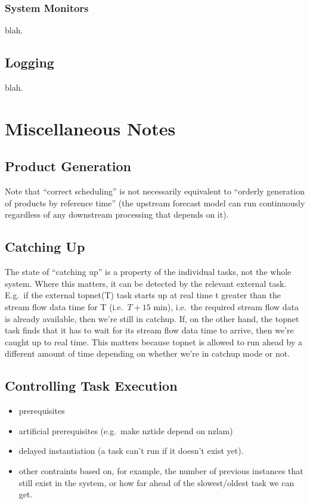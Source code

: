\documentclass[11pt,a4paper]{article}
\begin{document}
\subsubsection{System Monitors}
blah.

\subsection{Logging}
blah.

\section{Miscellaneous Notes}

\subsection{Product Generation}

Note that ``correct scheduling'' is not necessarily equivalent to
``orderly generation of products by reference time'' (the upstream 
forecast model can run continuously regardless of any downstream
processing that depends on it).

\subsection{Catching Up}

The state of ``catching up'' is a property of the individual tasks, not
the whole system. Where this matters, it can be detected by the relevant
external task. E.g.\ if the external topnet(T) task starts up at real
time t greater than the stream flow data time for T (i.e.\ $T+15$ min),
i.e.\ the required stream flow data is already available, then we're
still in catchup. If, on the other hand, the topnet task finds that it
has to wait for its stream flow data time to arrive, then we're caught
up to real time.  This matters because topnet is allowed to run ahead by
a different amount of time depending on whether we're in catchup mode or
not.

\subsection{Controlling Task Execution}

\begin{itemize}
 \item  prerequisites
 \item artificial prerequisites (e.g.\ make nztide depend on nzlam)
 \item delayed instantiation (a task can't run if it doesn't exist yet).
 \item other contraints based on, for example, the number of previous
 instances that still exist in the system, or how far ahead of the 
 slowest/oldest task we can get.
\end{itemize}
\end{document}
